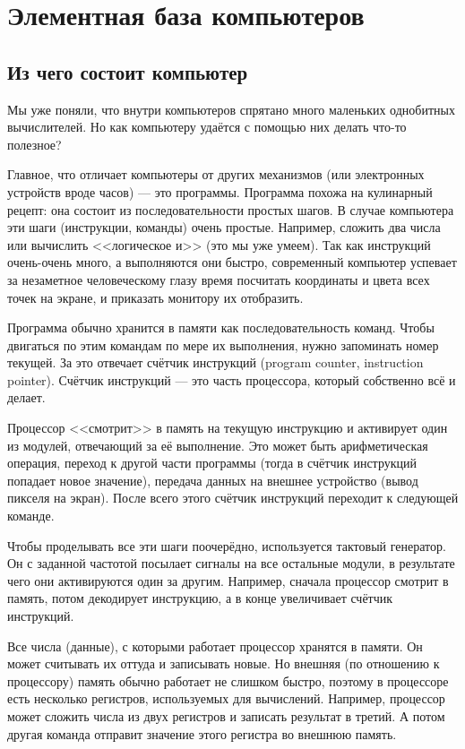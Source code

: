 \chapter{Элементная база компьютеров}

\section{Из чего состоит компьютер}

Мы уже поняли, что внутри компьютеров спрятано много маленьких однобитных вычислителей.
Но как компьютеру удаётся с помощью них делать что-то полезное?

Главное, что отличает компьютеры от других механизмов (или электронных устройств вроде часов) ---
это программы. Программа похожа на кулинарный рецепт: она состоит из последовательности
простых шагов. В случае компьютера эти шаги (инструкции, команды) очень простые. Например, сложить два числа
или вычислить <<логическое и>> (это мы уже умеем).
Так как инструкций очень-очень много, а выполняются они быстро, современный компьютер успевает за незаметное
человеческому глазу время посчитать координаты и цвета всех точек на экране, и приказать
монитору их отобразить.

Программа обычно хранится в памяти как последовательность команд. Чтобы двигаться по этим командам по мере их выполнения,
нужно запоминать номер текущей. За это отвечает счётчик инструкций (program counter, instruction pointer).
Счётчик инструкций --- это часть процессора, который собственно всё и делает.

Процессор <<смотрит>> в память на текущую инструкцию и активирует один из модулей, отвечающий за её выполнение.
Это может быть арифметическая операция, переход к другой части программы (тогда в счётчик инструкций попадает новое значение),
передача данных на внешнее устройство (вывод пикселя на экран). После всего этого счётчик инструкций переходит к следующей
команде.

Чтобы проделывать все эти шаги поочерёдно, используется тактовый генератор. Он с заданной частотой посылает
сигналы на все остальные модули, в результате чего они активируются один за другим. Например, сначала
процессор смотрит в память, потом декодирует инструкцию, а в конце увеличивает счётчик инструкций.

Все числа (данные), с которыми работает процессор хранятся в памяти. Он может считывать их оттуда и записывать новые.
Но внешняя (по отношению к процессору) память обычно работает не слишком быстро, поэтому в процессоре есть несколько
регистров, используемых для вычислений. Например, процессор может сложить числа из двух регистров и записать результат
в третий. А потом другая команда отправит значение этого регистра во внешнюю память.

